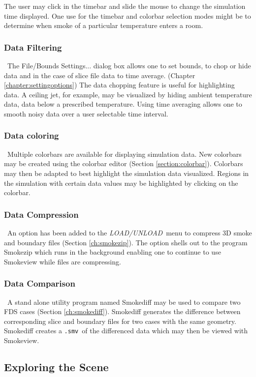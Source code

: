 \documentclass[11pt,twoside]{book}
\begin{document}
The user may click in the timebar and slide the mouse to
change the simulation time displayed. One use for the timebar and colorbar selection modes might be to determine
when smoke of a particular temperature enters a room.

\subsubsection{Data Filtering}\ The File/Bounds Settings...
dialog box allows one to set bounds, to chop or hide data and in the case
of slice file data to time average. (Chapter \ref{chapter:settingoptions})
The data chopping
feature is useful for highlighting data.  A ceiling jet, for example,
may be visualized by hiding ambient temperature
data,  data below a prescribed temperature.
Using time averaging allows one to smooth noisy data over a user selectable time
interval.

\subsubsection{Data coloring}\ Multiple colorbars are available for displaying simulation data.
New colorbars may be created using the colorbar editor (Section \ref{section:colorbar}).
Colorbars may then be adapted to best highlight the simulation data visualized.
Regions in the simulation with certain data values may be highlighted by clicking
on the colorbar.

\subsubsection{Data Compression}\ An option has been added to the
{\em LOAD/UNLOAD}\ menu to compress 3D smoke and boundary
files (Section \ref{ch:smokezip}). The option shells out to the program Smokezip which runs in
the background enabling one to continue to use Smokeview while
files are compressing.

\subsubsection{Data Comparison}\ A stand alone utility program named Smokediff
may be used to compare two FDS cases (Section \ref{ch:smokediff}).
Smokediff generates the difference between corresponding slice and boundary
files for two cases with the same geometry.  Smokediff creates a
{\tt .smv}\ of the differenced data which may then be viewed with Smokeview.


\subsection{Exploring the Scene}
\end{document}

